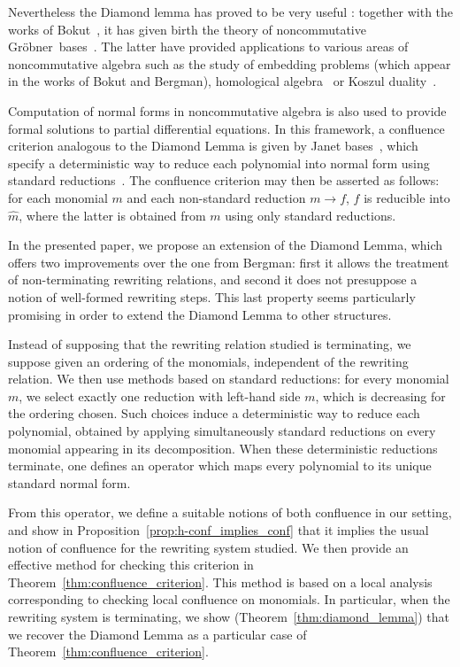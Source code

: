\documentclass[10pt]{easychair}
\theoremstyle{definition}
\newcommand\G{Gröbner}
\begin{document}
Nevertheless the Diamond lemma has proved to be very useful : together with the works of Bokut~\cite{MR0506423}, it has given birth the theory of noncommutative \G\ bases~\cite{MR1299371}. The latter have provided applications to various areas of noncommutative algebra such as the study of embedding problems (which appear in the works of Bokut and Bergman), homological algebra~\cite{MR1072284, MR2110434} or Koszul duality~\cite{MR1832913, MR0265437}.

Computation of normal forms in noncommutative algebra is also used to provide formal solutions to partial differential equations. In this framework, a confluence criterion analogous to the Diamond Lemma is given by Janet bases~\cite{MR2394773}, which specify a deterministic way to reduce each polynomial into normal form using standard reductions~\cite{Mell}. The confluence criterion may then be asserted as follows: for each monomial $m$ and each non-standard reduction $m\to f$, $f$ is reducible into $\widehat{m}$, where the latter is obtained from $m$ using only standard reductions.

In the presented paper, we propose an extension of the Diamond Lemma, which offers two improvements over the one from Bergman: first it allows the treatment of non-terminating rewriting relations, and second it does not presuppose a notion of well-formed rewriting steps. This last property seems particularly promising in order to extend the Diamond Lemma to other structures.

Instead of supposing that the rewriting relation studied is terminating, we suppose given an ordering of the monomials, independent of the rewriting relation.
We then use methods based on standard reductions: for every monomial $m$, we select exactly one reduction with left-hand side $m$, which is decreasing for the ordering chosen. Such choices induce a deterministic way to reduce each polynomial, obtained by applying simultaneously standard reductions on every monomial appearing in its decomposition. When these deterministic reductions terminate, one defines an operator which maps every polynomial to its unique standard normal form.

From this operator, we define a suitable notions of both confluence in our setting, and show in Proposition~\ref{prop:h-conf_implies_conf} that it implies the usual notion of confluence for the rewriting system studied. We then provide an effective method for checking this criterion in  Theorem~\ref{thm:confluence_criterion}. This method is based on a local analysis corresponding to checking local confluence on monomials. In particular, when the rewriting system is terminating, we show (Theorem~\ref{thm:diamond_lemma}) that we recover the Diamond Lemma as a particular case of Theorem~\ref{thm:confluence_criterion}.
\end{document}
